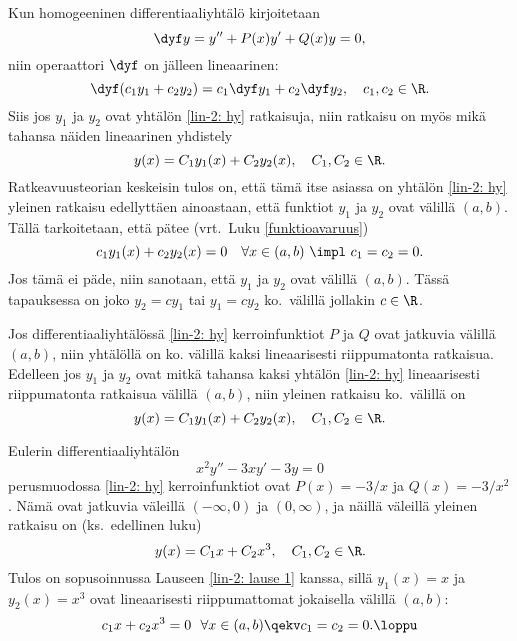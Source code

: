 Kun homogeeninen differentiaaliyhtälö kirjoitetaan
\begin{equation} \label{lin-2: hy}
\dyf y=y''+P(x)y'+Q(x)y=0,
\end{equation}
niin operaattori $\dyf$ on jälleen lineaarinen:
%
\[
\dyf(c_1y_1+c_2y_2)=c_1\dyf y_1+c_2\dyf y_2, \quad c_1,c_2\in\R.
\]
Siis jos $y_1$ ja $y_2$ ovat yhtälön \eqref{lin-2: hy} ratkaisuja, niin ratkaisu on myös mikä
tahansa näiden lineaarinen yhdistely
\[
y(x)=C_1y_1(x)+C_2y_2(x),\quad C_1,C_2\in\R.
\]
Ratkeavuusteorian keskeisin tulos on, että tämä itse asiassa on yhtälön \eqref{lin-2: hy}
yleinen ratkaisu edellyttäen ainoastaan, että funktiot $y_1$ ja $y_2$ ovat
%
 välillä $(a,b)$. Tällä tarkoitetaan, että pätee (vrt.\ Luku 
\ref{funktioavaruus})
\[
c_1y_1(x)+c_2y_2(x)=0 \quad \forall x\in (a,b) \ \impl \ c_1=c_2=0.
\]
%
Jos tämä ei päde, niin sanotaan, että $y_1$ ja $y_2$ ovat  välillä
$(a,b)$. Tässä tapauksessa on joko $y_2=cy_1$ tai $y_1=cy_2$ ko.\ välillä jollakin $c\in\R$. 
\begin{*Lause} \label{lin-2: lause 1} Jos differentiaaliyhtälössä \eqref{lin-2: hy} 
kerroinfunktiot $P$ ja $Q$ ovat jatkuvia välillä $(a,b)$, niin yhtälöllä on ko. välillä kaksi
lineaarisesti riippumatonta ratkaisua. Edelleen jos $y_1$ ja $y_2$ ovat mitkä tahansa kaksi
yhtälön \eqref{lin-2: hy} lineaarisesti riippumatonta ratkaisua välillä $(a,b)$, niin yleinen
ratkaisu ko.\ välillä on
\[
y(x)=C_1y_1(x)+C_2y_2(x),\quad C_1,C_2\in\R.
\]
\end{*Lause}
\begin{Exa} \label{lin-2: lause 1 - esim}
Eulerin differentiaaliyhtälön
\[
x^2y''-3xy'-3y=0
\]
perusmuodossa \eqref{lin-2: hy} kerroinfunktiot ovat $P(x)=-3/x$ ja $Q(x)=-3/x^2$. Nämä ovat
jatkuvia väleillä $(-\infty,0)$ ja $(0,\infty)$, ja näillä väleillä yleinen ratkaisu on
(ks.\ edellinen luku)
\[
y(x)=C_1x+C_2x^3, \quad C_1,C_2\in\R.
\]
Tulos on sopusoinnussa Lauseen \ref{lin-2: lause 1} kanssa, sillä $y_1(x)=x$ ja $y_2(x)=x^3$
ovat lineaarisesti riippumattomat jokaisella välillä $(a,b)$:
\[
c_1x+c_2x^3 = 0 \ \ \forall x \in (a,b) \qekv c_1=c_2 = 0. \loppu
\]
\end{Exa}
